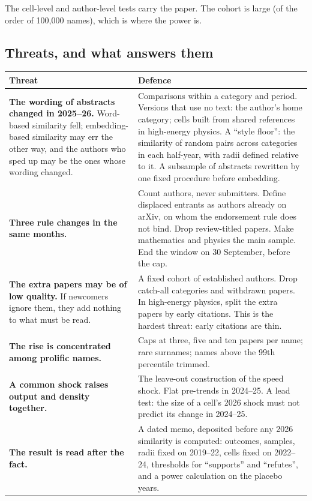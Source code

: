 The cell-level and author-level tests carry the paper. The cohort is large (of the order of 100,000 names), which is where the power is.

\subsection{Threats, and what answers them}

\begin{center}\small
\begin{tabularx}{\textwidth}{@{}P{1.45in}L@{}}
\toprule
Threat & Defence \\
\midrule
\textbf{The wording of abstracts changed in 2025--26.} Word-based similarity fell; embedding-based similarity may err the other way, and the authors who sped up may be the ones whose wording changed. & Comparisons within a category and period. Versions that use no text: the author's home category; cells built from shared references in high-energy physics. A ``style floor'': the similarity of random pairs across categories in each half-year, with radii defined relative to it. A subsample of abstracts rewritten by one fixed procedure before embedding. \\
\textbf{Three rule changes in the same months.} & Count authors, never submitters. Define displaced entrants as authors already on arXiv, on whom the endorsement rule does not bind. Drop review-titled papers. Make mathematics and physics the main sample. End the window on 30 September, before the cap. \\
\textbf{The extra papers may be of low quality.} If newcomers ignore them, they add nothing to what must be read. & A fixed cohort of established authors. Drop catch-all categories and withdrawn papers. In high-energy physics, split the extra papers by early citations. This is the hardest threat: early citations are thin. \\
\textbf{The rise is concentrated among prolific names.} & Caps at three, five and ten papers per name; rare surnames; names above the 99th percentile trimmed. \\
\textbf{A common shock raises output and density together.} & The leave-out construction of the speed shock. Flat pre-trends in 2024--25. A lead test: the size of a cell's 2026 shock must not predict its change in 2024--25. \\
\textbf{The result is read after the fact.} & A dated memo, deposited before any 2026 similarity is computed: outcomes, samples, radii fixed on 2019--22, cells fixed on 2022--24, thresholds for ``supports'' and ``refutes'', and a power calculation on the placebo years. \\
\bottomrule
\end{tabularx}
\end{center}

